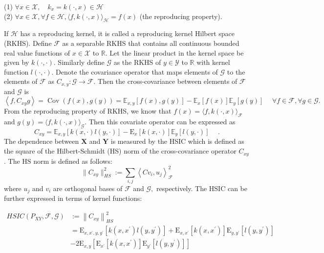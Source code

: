 \documentclass[a4paper,12pt]{article}
\begin{document}
(1) $\forall x \in \mathcal{X}, \quad k_{x}=k(\cdot, x) \in \mathcal{H}$ \\
(2) $\forall x \in \mathcal{X}, \forall f \in \mathcal{H},\langle f, k(\cdot, x)\rangle_{\mathcal{H}}=f(x)$ (the reproducing property).

If $\mathcal{H}$ has a reproducing kernel, it is called a reproducing kernel Hilbert space (RKHS). Define $\mathcal{F}$ as a separable RKHS that contains all continuous bounded real value functions of $x \in \mathcal{X}$ to $\mathbb{R}$. Let the linear product in the kernel space be given by $k(\cdot,\cdot)$. Similarly define $\mathcal{G}$ as the RKHS of $y \in \mathcal{Y}$ to $\mathbb{R}$ with kernel function $l(\cdot,\cdot)$. Denote the covariance operator that maps elements of $\mathcal{G}$ to the elements of $\mathcal{F}$ as $C_{x, y}: \mathcal{G} \rightarrow \mathcal{F}$. Then the cross-covariance between elements of  $\mathcal{F}$ and  $\mathcal{G}$ is 
\begin{equation*}
\left\langle f, C_{x y} g\right\rangle=\operatorname{Cov}(f(x), g(y))=\mathbb{E}_{x, y}[f(x), g(y)]-\mathbb{E}_{x}[f(x)] \mathbb{E}_{y}[g(y)] \hspace{15pt} \forall f \in \mathcal{F}, \forall g \in \mathcal{G} \text{.}
\end{equation*}
From the reproducing property of RKHS, we know that $f(x) = \langle f, k(\cdot, x)\rangle_{\mathcal{F}}$ and $g(y) = \langle f, k(\cdot, x)\rangle_{\mathcal{G}}$. Then this covariate operator can be expressed as
\begin{equation*}
C_{x y}=\mathbb{E}_{x, y}[k(x, \cdot) l(y, \cdot)]-\mathrm{E}_{x}[k(x, \cdot)] \mathbb{E}_{y}[l(y, \cdot)]   \hspace{15pt}\text{.}
\end{equation*}
The dependence between $\boldsymbol{X}$ and $\boldsymbol{Y}$ is measured by the HSIC which is defined as the square of the Hilbert-Schmidt (HS) norm of the cross-covariance operator $C_{x y}$. The HS norm is defined as follows:
\begin{equation*}
\|C_{x y}\|_{H S}^{2}:=\sum_{i, j}\left\langle C v_{i}, u_{j}\right\rangle_{\mathcal{F}}^{2}
\end{equation*}
where $u_{j}$ and $v_{i}$ are orthogonal bases of $\mathcal{F}$ and $\mathcal{G},$ respectively. The HSIC can be further expressed in terms of kernel functions:

\begin{align*}
H S I C\left(P_{XY}, \mathcal{F}, \mathcal{G}\right)&:=\left\|C_{x y}\right\|_{HS}^{2} \\
&=\mathrm{E}_{x, x^{\prime}, y, y^{\prime}}\left[k\left(x, x^{\prime}\right) l\left(y, y^{\prime}\right)\right]+\mathrm{E}_{x, x^{\prime}}\left[k\left(x, x^{\prime}\right)\right] \mathrm{E}_{y, y^{\prime}}\left[l\left(y, y^{\prime}\right)\right] \\
& -2 \mathrm{E}_{x, y}\left[\mathrm{E}_{x^{\prime}}\left[k\left(x, x^{\prime}\right)\right] \mathrm{E}_{y^{\prime}}\left[l\left(y, y^{\prime}\right)\right]\right] 
\end{align*}
\end{document}
